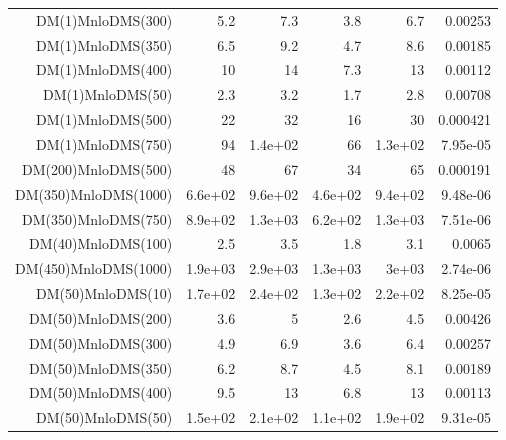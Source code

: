 \begin{table}[hbtp]
\begin{center}
{\begin{tabular}{rrrrrr}
DM(1)MnloDMS(300)         & 5.2          & 7.3          & 3.8          & 6.7          & 0.00253         \\
DM(1)MnloDMS(350)         & 6.5          & 9.2          & 4.7          & 8.6          & 0.00185         \\
DM(1)MnloDMS(400)         & 10           & 14           & 7.3          & 13           & 0.00112         \\
DM(1)MnloDMS(50)          & 2.3          & 3.2          & 1.7          & 2.8          & 0.00708         \\
DM(1)MnloDMS(500)         & 22           & 32           & 16           & 30           & 0.000421        \\
DM(1)MnloDMS(750)         & 94           & 1.4e+02      & 66           & 1.3e+02      & 7.95e-05        \\
DM(200)MnloDMS(500)       & 48           & 67           & 34           & 65           & 0.000191        \\
DM(350)MnloDMS(1000)      & 6.6e+02      & 9.6e+02      & 4.6e+02      & 9.4e+02      & 9.48e-06        \\
DM(350)MnloDMS(750)       & 8.9e+02      & 1.3e+03      & 6.2e+02      & 1.3e+03      & 7.51e-06        \\
DM(40)MnloDMS(100)        & 2.5          & 3.5          & 1.8          & 3.1          & 0.0065          \\
DM(450)MnloDMS(1000)      & 1.9e+03      & 2.9e+03      & 1.3e+03      & 3e+03        & 2.74e-06        \\
DM(50)MnloDMS(10)         & 1.7e+02      & 2.4e+02      & 1.3e+02      & 2.2e+02      & 8.25e-05        \\
DM(50)MnloDMS(200)        & 3.6          & 5            & 2.6          & 4.5          & 0.00426         \\
DM(50)MnloDMS(300)        & 4.9          & 6.9          & 3.6          & 6.4          & 0.00257         \\
DM(50)MnloDMS(350)        & 6.2          & 8.7          & 4.5          & 8.1          & 0.00189         \\
DM(50)MnloDMS(400)        & 9.5          & 13           & 6.8          & 13           & 0.00113         \\
DM(50)MnloDMS(50)         & 1.5e+02      & 2.1e+02      & 1.1e+02      & 1.9e+02      & 9.31e-05        \\
\hline 
  \end{tabular}
}
  \end{center}
\end{table}



